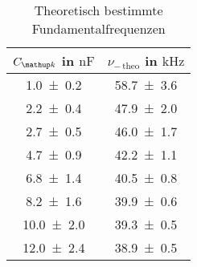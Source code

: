 \begin{table}
\centering
\caption{Theoretisch bestimmte Fundamentalfrequenzen}
\label{fig:teilb_frequenzen_theo}
\begin{tabular}{S S }
\toprule
{$C\ua{k}$ in $\si{\nano\farad}$} &{$\nu_{-\,\mathup{theo}}$ in $\si{\kilo\hertz}$}  \\ 
\midrule
 \num{1.0\pm0.2} & \num{58.7\pm3.6}\\
\num{2.2\pm0.4} & \num{47.9\pm2.0}\\
\num{2.7\pm0.5} & \num{46.0\pm1.7}\\
\num{4.7\pm0.9} & \num{42.2\pm1.1}\\
\num{6.8\pm1.4} & \num{40.5\pm0.8}\\
\num{8.2\pm1.6} & \num{39.9\pm0.6}\\
\num{10.0\pm2.0} & \num{39.3\pm0.5}\\
\num{12.0\pm2.4} & \num{38.9\pm0.5}\\
\bottomrule
\end{tabular}
\end{table}
